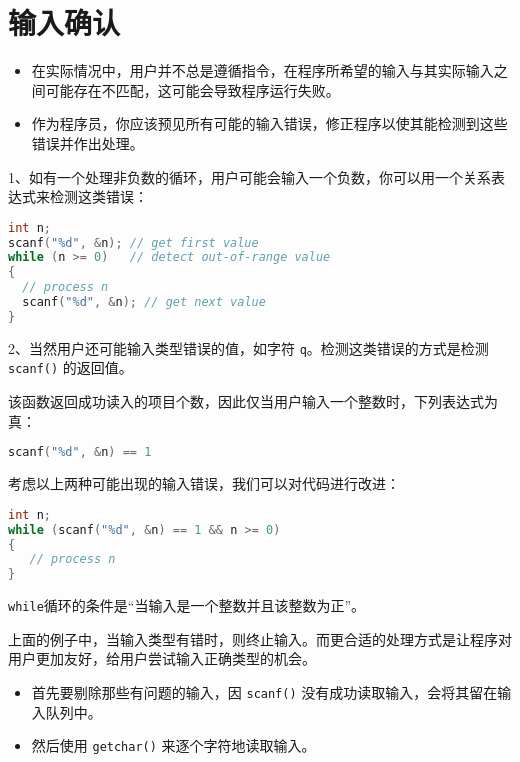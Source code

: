 \section{输入确认}
\begin{frame}[fragile]\ft{\secname}
\begin{itemize}
\item
在实际情况中，用户并不总是遵循指令，在程序所希望的输入与其实际输入之间可能存在不匹配，这可能会导致程序运行失败。\\[0.1in]
\item
作为程序员，你应该预见所有可能的输入错误，修正程序以使其能检测到这些错误并作出处理。
\end{itemize}
\end{frame}

\begin{frame}[fragile]\ft{\secname}
1、如有一个处理非负数的循环，用户可能会输入一个负数，你可以用一个关系表达式来检测这类错误：
\begin{lstlisting}[language=c]
int n;
scanf("%d", &n); // get first value
while (n >= 0)   // detect out-of-range value
{
  // process n
  scanf("%d", &n); // get next value
}
\end{lstlisting}
\end{frame}

\begin{frame}[fragile]\ft{\secname}
2、当然用户还可能输入类型错误的值，如字符 \lstinline|q|。检测这类错误的方式是检测 \lstinline|scanf()| 的返回值。 \vspace{0.1in}

该函数返回成功读入的项目个数，因此仅当用户输入一个整数时，下列表达式为真：
\begin{lstlisting}[language=c]
scanf("%d", &n) == 1
\end{lstlisting}
\end{frame}

\begin{frame}[fragile]\ft{\secname}
考虑以上两种可能出现的输入错误，我们可以对代码进行改进：
\begin{lstlisting}[language=c]
int n;
while (scanf("%d", &n) == 1 && n >= 0) 
{
   // process n 
}
\end{lstlisting}
\lstinline|while|循环的条件是“当输入是一个整数并且该整数为正”。
\end{frame}

\begin{frame}[fragile]\ft{\secname}
上面的例子中，当输入类型有错时，则终止输入。而更合适的处理方式是让程序对用户更加友好，给用户尝试输入正确类型的机会。\vspace{.1in}

\begin{itemize}
\item 首先要剔除那些有问题的输入，因 \lstinline|scanf()| 没有成功读取输入，会将其留在输入队列中。\\[0.1in]
\item 然后使用 \lstinline|getchar()| 来逐个字符地读取输入。
\end{itemize}

\end{frame}

